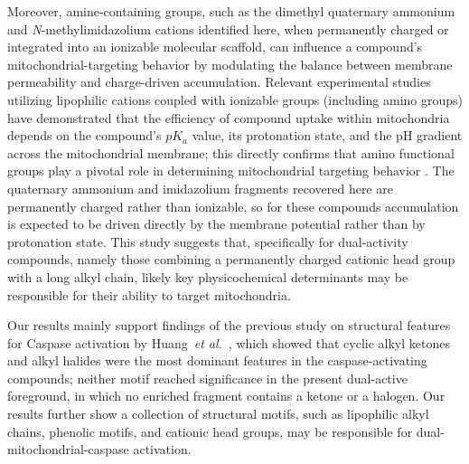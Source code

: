 \documentclass[letterpaper]{article}
\begin{document}
Moreover, amine-containing groups, such as the dimethyl quaternary ammonium and \textit{N}-methylimidazolium cations identified here, when permanently charged or integrated into an ionizable molecular scaffold, can influence a compound's mitochondrial-targeting behavior by modulating the balance between membrane permeability and charge-driven accumulation. Relevant experimental studies utilizing lipophilic cations coupled with ionizable groups (including amino groups) have demonstrated that the efficiency of compound uptake within mitochondria depends on the compound's $pK_a$ value, its protonation state, and the pH gradient across the mitochondrial membrane; this directly confirms that amino functional groups play a pivotal role in determining mitochondrial targeting behavior \cite{finichiu2013mitochondrial}. The quaternary ammonium and imidazolium fragments recovered here are permanently charged rather than ionizable, so for these compounds accumulation is expected to be driven directly by the membrane potential rather than by protonation state. This study suggests that, specifically for dual-activity compounds, namely those combining a permanently charged cationic head group with a long alkyl chain, likely key physicochemical determinants may be responsible for their ability to target mitochondria.

Our results mainly support findings of the previous study on structural features for Caspase activation by Huang~\textit{et al.}~\cite{Huang2009}, which showed that cyclic alkyl ketones and alkyl halides were the most dominant features in the caspase-activating compounds; neither motif reached significance in the present dual-active foreground, in which no enriched fragment contains a ketone or a halogen. Our results further show a collection of structural motifs, such as lipophilic alkyl chains, phenolic motifs, and cationic head groups, may be responsible for dual-mitochondrial-caspase activation.
\end{document}
